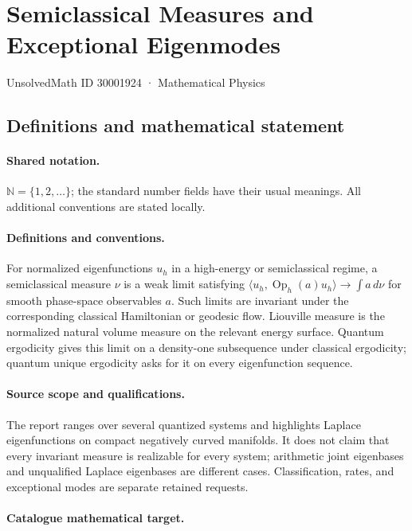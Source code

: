 \documentclass[11pt]{article}
\begin{document}
\setcounter{section}{30001923}
\section{Semiclassical Measures and Exceptional Eigenmodes}\label{30001924}
{\small UnsolvedMath ID 30001924 · Mathematical Physics}
\subsection{Definitions and mathematical statement}

\paragraph{Shared notation.}$\mathbb N=\{1,2,\ldots\}$; the standard number fields have their usual meanings. All additional conventions are stated locally.


\paragraph{Definitions and conventions.} For normalized eigenfunctions $u_h$ in a high-energy or semiclassical regime, a semiclassical measure $\nu$ is a weak limit satisfying $\langle u_h,\operatorname{Op}_h(a)u_h\rangle\to\int a\,d\nu$ for smooth phase-space observables $a$. Such limits are invariant under the corresponding classical Hamiltonian or geodesic flow. Liouville measure is the normalized natural volume measure on the relevant energy surface. Quantum ergodicity gives this limit on a density-one subsequence under classical ergodicity; quantum unique ergodicity asks for it on every eigenfunction sequence.

\paragraph{Source scope and qualifications.} The report ranges over several quantized systems and highlights Laplace eigenfunctions on compact negatively curved manifolds. It does not claim that every invariant measure is realizable for every system; arithmetic joint eigenbases and unqualified Laplace eigenbases are different cases. Classification, rates, and exceptional modes are separate retained requests.

\paragraph{Catalogue mathematical target.}
\end{document}
